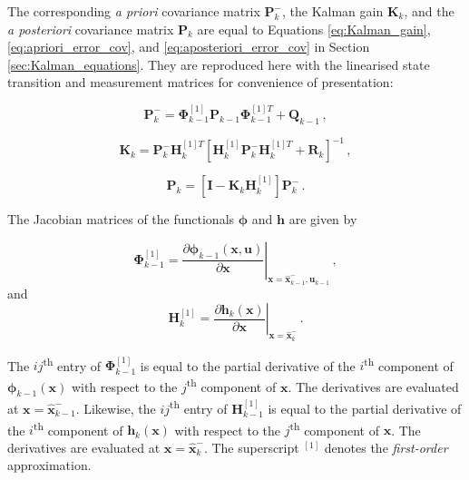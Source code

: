 \noindent
The corresponding \emph{a priori} covariance matrix $\mathbf{P}^-_{k}$, the Kalman gain $\mathbf{K}_{k}$, and the \emph{a posteriori} covariance matrix $\mathbf{P}_{k}$ are equal to Equations \ref{eq:Kalman_gain}, \ref{eq:apriori_error_cov}, and \ref{eq:aposteriori_error_cov} in Section \ref{sec:Kalman_equations}. They are reproduced here with the linearised state transition and measurement matrices for convenience of presentation:

\begin{equation}\label{eq:apriori_error_cov_extended}
  \mathbf{P}^-_{k} = \bm{\Phi}^{[1]}_{k-1} \mathbf{P}_{k-1} \bm{\Phi}^{[1]T}_{k-1} + \mathbf{Q}_{k-1}\,,
\end{equation}

\begin{equation}\label{eq:Kalman_gain_extended}
  \mathbf{K}_{k} = \mathbf{P}^-_k \mathbf{H}^{[1]T}_k[\mathbf{H}^{[1]}_k \mathbf{P}^-_k \mathbf{H}^{[1]T}_k + \mathbf{R}_k]^{-1}\,,
\end{equation}

\begin{equation}\label{eq:aposteriori_error_cov_extended}
  \mathbf{P}_{k} = [\mathbf{I} - \mathbf{K}_{k}\mathbf{H}^{[1]}_{k}]\mathbf{P}^-_{k}\,.
\end{equation}

\noindent
The Jacobian matrices of the functionals $\bm{\phi}$ and $\mathbf{h}$ are given by  

\begin{equation}\label{eq:Phi_first_order}
  \bm{\Phi}^{[1]}_{k-1} =  \left. \frac{\partial \bm{\phi}_{k-1}(\mathbf{x}, \mathbf{u})}{\partial \mathbf{x}} \right|_{\mathbf{x}=\hat{\mathbf{x}}^-_{k-1}, \mathbf{u}_{k-1}} \,,
\end{equation}
and
\begin{equation}\label{eq:Phi_first_order}
  \mathbf{H}^{[1]}_{k} = \left. \frac{\partial \mathbf{h}_{k}(\mathbf{x})}{\partial \mathbf{x}} \right|_{\mathbf{x}=\hat{\mathbf{x}}^-_{k}} \,.
\end{equation}

\noindent
The $ij$\textsuperscript{th} entry of $\bm{\Phi}^{[1]}_{k-1}$ is equal to the partial derivative of the $i$\textsuperscript{th} component of $\bm{\phi}_{k-1}(\mathbf{x})$ with respect to the $j$\textsuperscript{th} component of $\mathbf{x}$. The derivatives are evaluated at $\mathbf{x}=\hat{\mathbf{x}}^-_{k-1}$. Likewise, the $ij$\textsuperscript{th} entry of $\mathbf{H}^{[1]}_{k-1}$ is equal to the partial derivative of the $i$\textsuperscript{th} component of $\mathbf{h}_{k}(\mathbf{x})$ with respect to the $j$\textsuperscript{th} component of $\mathbf{x}$. The derivatives are evaluated at $\mathbf{x}=\hat{\mathbf{x}}^-_{k}$. The superscript $^{[1]}$ denotes the \emph{first-order} approximation.

